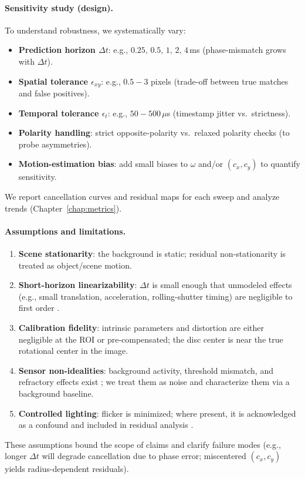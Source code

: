 \paragraph{Sensitivity study (design).}
To understand robustness, we systematically vary:
\begin{itemize}
    \item \textbf{Prediction horizon $\Delta t$}: e.g., $0.25,\,0.5,\,1,\,2,\,4$\,ms (phase-mismatch grows with $\Delta t$).
    \item \textbf{Spatial tolerance $\epsilon_{xy}$}: e.g., $0.5\!-\!3$ pixels (trade-off between true matches and false positives).
    \item \textbf{Temporal tolerance $\epsilon_t$}: e.g., $50\!-\!500\,\mu$s (timestamp jitter vs.\ strictness).
    \item \textbf{Polarity handling}: strict opposite-polarity vs.\ relaxed polarity checks (to probe asymmetries).
    \item \textbf{Motion-estimation bias}: add small biases to $\omega$ and/or $(c_x,c_y)$ to quantify sensitivity.
\end{itemize}
We report cancellation curves and residual maps for each sweep and analyze trends (Chapter~\ref{chap:metrics}).

\paragraph{Assumptions and limitations.}
\begin{enumerate}
    \item \textbf{Scene stationarity}: the background is static; residual non-stationarity is treated as object/scene motion.
    \item \textbf{Short-horizon linearizability}: $\Delta t$ is small enough that unmodeled effects (e.g., small translation, acceleration, rolling-shutter timing) are negligible to first order \cite{Gallego2017Angular}.
    \item \textbf{Calibration fidelity}: intrinsic parameters and distortion are either negligible at the ROI or pre-compensated; the disc center is near the true rotational center in the image.
    \item \textbf{Sensor non-idealities}: background activity, threshold mismatch, and refractory effects exist \cite{Brandli2014,Delbruck2020}; we treat them as noise and characterize them via a background baseline.
    \item \textbf{Controlled lighting}: flicker is minimized; where present, it is acknowledged as a confound and included in residual analysis \cite{Gallego2020Survey}.
\end{enumerate}
These assumptions bound the scope of claims and clarify failure modes (e.g., longer $\Delta t$ will degrade cancellation due to phase error; miscentered $(c_x,c_y)$ yields radius-dependent residuals).
\vspace{0.5em}

